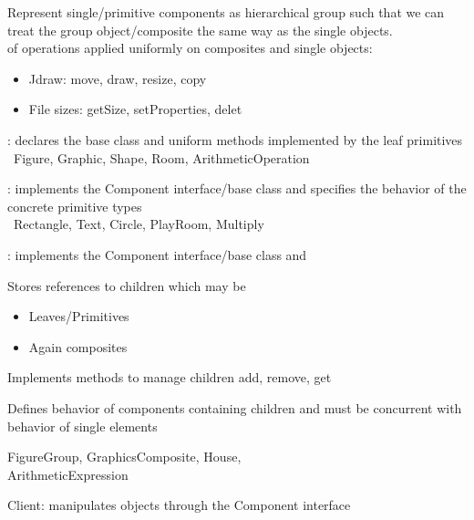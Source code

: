 \begin{intentbox}[Intent]
  Represent single/primitive components as hierarchical group such that we can treat
  the group object/composite the same way as the single objects.\\
   of operations applied uniformly on composites and single objects:
  \begin{itemize}
      \item Jdraw: move, draw, resize, copy
      \item File sizes: getSize, setProperties, delet
  \end{itemize}
\end{intentbox}
\begin{partbox}[Paticipants]
  \begin{itemizenosep}
      \item {}: declares the base class
    and uniform methods implemented by the leaf primitives\\
      \ Figure, Graphic, Shape, Room, ArithmeticOperation
      \item {}: implements the Component interface/base class and
    specifies the behavior of the concrete primitive types\\
      \ Rectangle, Text, Circle, PlayRoom, Multiply
      \item {}: implements the Component interface/base class and
      \begin{itemizenosep}
          \item Stores references to children which may be
          \begin{itemize}
              \item Leaves/Primitives
              \item Again composites
          \end{itemize}
          \item Implements methods to manage children add, remove, get
          \item Defines behavior of components containing children and must be
          concurrent with behavior of single elements
      \end{itemizenosep}
       FigureGroup, GraphicsComposite, House,\\ ArithmeticExpression
        \item Client: manipulates objects through the Component interface
  \end{itemizenosep}
\end{partbox}

